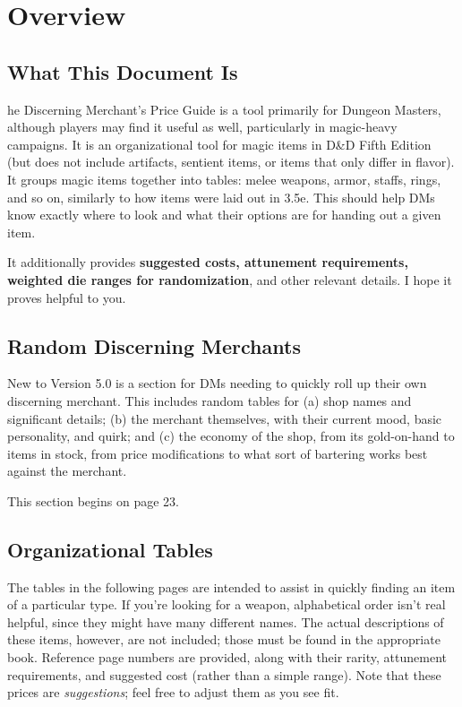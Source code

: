 \documentclass[10pt,a4paper,twoside,bg=print,twocolumn,openany,nodeprecatedcode]{dndbook}
\date{}
\begin{document}
\frontmatter
\tableofcontents
\mainmatter
\chapter{Overview}
\section{What This Document Is}
he Discerning Merchant's Price Guide is a tool primarily for Dungeon Masters, although players may find it useful as well, particularly in magic-heavy campaigns. It is an organizational tool for magic items in D\&D Fifth Edition (but does not include artifacts, sentient items, or items that only differ in flavor). It groups magic items together into tables: melee weapons, armor, staffs, rings, and so on, similarly to how items were laid out in 3.5e. This should help DMs know exactly where to look and what their options are for handing out a given item.


It additionally provides \textbf{suggested costs, attunement requirements, weighted die ranges for randomization}, and other relevant details. I hope it proves helpful to you.

\section{Random Discerning Merchants}
New to Version 5.0 is a section for DMs needing to quickly roll up their own discerning merchant. This includes random tables for (a) shop names and significant details; (b) the merchant themselves, with their current mood, basic personality, and quirk; and (c) the economy of the shop, from its gold-on-hand to items in stock, from price modifications to what sort of bartering works best against the merchant.

This section begins on page 23.

\section{Organizational Tables}
The tables in the following pages are intended to assist in quickly finding an item of a particular type. If you're looking for a weapon, alphabetical order isn't real helpful, since they might have many different names. The actual descriptions of these items, however, are not included; those must be found in the appropriate book. Reference page numbers are provided, along with their rarity, attunement requirements, and suggested cost (rather than a simple range). Note that these prices are \textit{suggestions}; feel free to adjust them as you see fit.
\end{document}
